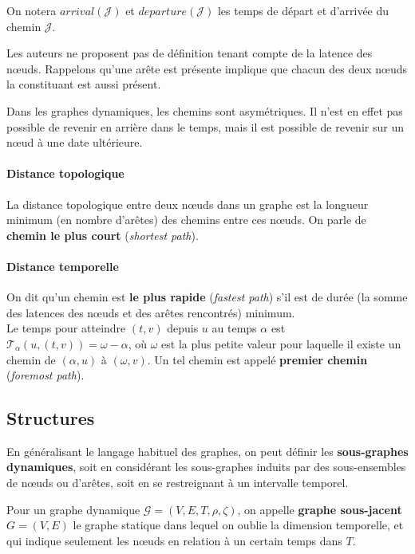 \documentclass[12pt,a4paper]{article}
\begin{document}
On notera \(arrival(\mathcal{J})\) et \(departure(\mathcal{J})\) les
temps de départ et d'arrivée du chemin \(\mathcal{J}\).

Les auteurs ne proposent pas de définition tenant compte de la latence
des nœuds. Rappelons qu'une arête est présente implique que chacun des
deux nœuds la constituant est aussi présent.

Dans les graphes dynamiques, les chemins sont asymétriques. Il n'est
en effet pas possible de revenir en arrière dans le temps, mais il est
possible de revenir sur un nœud à une date ultérieure.

\paragraph{Distance topologique} La distance topologique entre deux
nœuds dans un graphe est la longueur minimum (en nombre d'arêtes) des
chemins entre ces nœuds. On parle de \textbf{chemin le plus court}
(\textit{shortest path}).

\paragraph{Distance temporelle}
On dit qu'un chemin est \textbf{le plus rapide} (\textit{fastest
  path}) s'il est de durée (la somme des latences des nœuds et des
arêtes rencontrés) minimum.\\
Le temps pour atteindre \((t, v)\) depuis \(u\) au temps \(\alpha\)
est \(\mathcal{T}_{\alpha}(u, (t, v)) = \omega - \alpha\), où
\(\omega\) est la plus petite valeur pour laquelle il existe un chemin
de \((\alpha, u)\) à \((\omega, v)\). Un tel chemin est appelé
\textbf{premier chemin} (\textit{foremost path}).

\subsection{Structures}

En généralisant le langage habituel des graphes, on peut définir les
\textbf{sous-graphes dynamiques}, soit en considérant les sous-graphes
induits par des sous-ensembles de nœuds ou d'arêtes, soit en se
restreignant à un intervalle temporel.

Pour un graphe dynamique \(\mathcal{G} = (V, E, T, \rho, \zeta)\), on
appelle \textbf{graphe sous-jacent} \(G = (V, E)\) le graphe statique
dans lequel on oublie la dimension temporelle, et qui indique
seulement les nœuds en relation à un certain temps dans \(T\).
\end{document}
